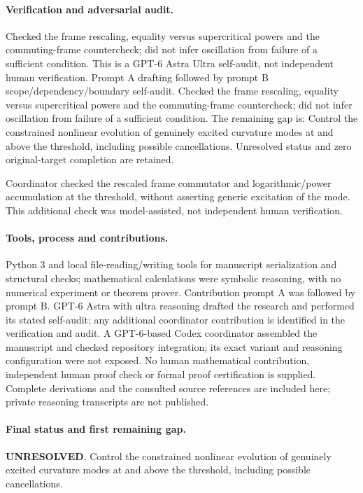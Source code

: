 \documentclass[11pt]{article}
\begin{document}
\paragraph{Verification and adversarial audit.}
Checked the frame rescaling, equality versus supercritical powers and the commuting-frame countercheck; did not infer oscillation from failure of a sufficient condition. This is a GPT-6 Astra Ultra self-audit, not independent human verification. Prompt A drafting followed by prompt B scope/dependency/boundary self-audit. Checked the frame rescaling, equality versus supercritical powers and the commuting-frame countercheck; did not infer oscillation from failure of a sufficient condition. The remaining gap is: Control the constrained nonlinear evolution of genuinely excited curvature modes at and above the threshold, including possible cancellations. Unresolved status and zero original-target completion are retained.

Coordinator checked the rescaled frame commutator and logarithmic/power accumulation at the threshold, without asserting generic excitation of the mode. This additional check was model-assisted, not independent human verification.

\paragraph{Tools, process and contributions.}
Python 3 and local file-reading/writing tools for manuscript serialization and structural checks; mathematical calculations were symbolic reasoning, with no numerical experiment or theorem prover. Contribution prompt A was followed by prompt B. GPT-6 Astra with ultra reasoning drafted the research and performed its stated self-audit; any additional coordinator contribution is identified in the verification and audit. A GPT-6-based Codex coordinator assembled the manuscript and checked repository integration; its exact variant and reasoning configuration were not exposed. No human mathematical contribution, independent human proof check or formal proof certification is supplied. Complete derivations and the consulted source references are included here; private reasoning transcripts are not published.

\paragraph{Final status and first remaining gap.}
\textbf{UNRESOLVED}. Control the constrained nonlinear evolution of genuinely excited curvature modes at and above the threshold, including possible cancellations.
\end{document}

